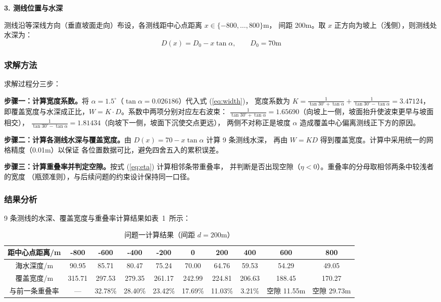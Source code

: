 \documentclass[withoutpreface,bwprint]{cumcmthesis} %
\begin{document}
\textbf{3. 测线位置与水深}

测线沿等深线方向（垂直坡面走向）布设，各测线距中心点距离 $x\in\{-800,\ldots,800\}$m，
间距 200m。取 $x$ 正方向为坡上（浅侧），则测线处水深为：
\begin{equation}
    D(x) = D_0 - x\tan\alpha, \qquad D_0 = 70\text{m}
\end{equation}

\subsubsection{求解方法}

求解过程分三步：

\textbf{步骤一：计算宽度系数。}将 $\alpha=1.5^\circ$（$\tan\alpha=0.026186$）代入式 (\ref{eq:width})，
宽度系数为
$K = \frac{1}{\tan30^\circ+\tan\alpha}+\frac{1}{\tan30^\circ-\tan\alpha} = 3.47124$，
即覆盖宽度与水深成正比，$W = K\cdot D$。系数中两项分别对应左右波束：
$\frac{1}{\tan30^\circ+\tan\alpha}=1.65690$（向坡上一侧，坡面抬升使波束更早与坡面相交），
$\frac{1}{\tan30^\circ-\tan\alpha}=1.81434$（向坡下一侧，坡面下沉使交点更远），
两侧不对称正是坡度 $\alpha$ 造成覆盖中心偏离测线正下方的原因。

\textbf{步骤二：计算各测线水深与覆盖宽度。}由 $D(x)=70-x\tan\alpha$ 计算 9 条测线水深，
再由 $W=KD$ 得到覆盖宽度。计算中采用统一的网格精度（0.01m）以保证
各位置数据可比，避免四舍五入的累积误差。

\textbf{步骤三：计算重叠率并判定空隙。}按式 (\ref{eq:eta}) 计算相邻条带重叠率，
并判断是否出现空隙（$\eta<0$）。重叠率的分母取相邻两条中较浅者的宽度
（瓶颈准则），与后续问题的约束设计保持同一口径。

\subsubsection{结果分析}

9 条测线的水深、覆盖宽度与重叠率计算结果如表~1~所示：

\begin{table}[htbp]
\centering
\caption{问题一计算结果（间距 $d=200$m）}
\label{tab:q1}
\begin{adjustbox}{width=\textwidth}
\begin{tabular}{cccccccccc}
\toprule[1.5pt]
距中心点距离/m & -800 & -600 & -400 & -200 & 0 & 200 & 400 & 600 & 800 \\ \midrule[1pt]
海水深度/m  & 90.95 & 85.71 & 80.47 & 75.24 & 70.00 & 64.76 & 59.53 & 54.29 & 49.05 \\
覆盖宽度/m  & 315.71 & 297.53 & 279.35 & 261.17 & 242.99 & 224.81 & 206.63 & 188.45 & 170.27 \\
与前一条重叠率 & --- & 32.78\% & 28.40\% & 23.42\% & 17.69\% & 11.03\% & 3.21\% & 空隙 11.55m & 空隙 29.73m \\
\bottomrule[1.5pt]
\end{tabular}
\end{adjustbox}
\end{table}
\end{document}

